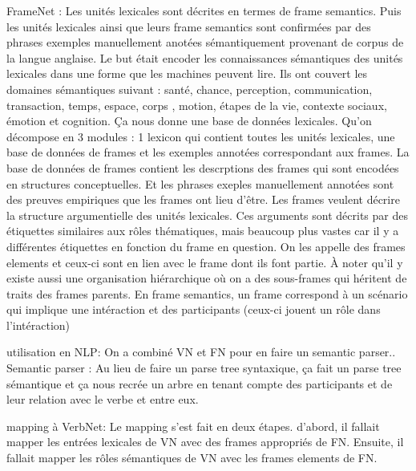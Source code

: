 FrameNet \citep{BakerBerkeleyFrameNetProject1998}: Les unités lexicales sont décrites en termes de frame semantics. Puis les unités lexicales ainsi que leurs frame semantics sont confirmées par des phrases exemples manuellement anotées sémantiquement provenant de corpus de la langue anglaise. Le but était encoder les connaissances sémantiques des unités lexicales dans une forme que les machines peuvent lire. Ils ont couvert les domaines sémantiques suivant : santé, chance, perception, communication, transaction, temps, espace, corps , motion, étapes de la vie, contexte sociaux, émotion et cognition. Ça nous donne une base de données lexicales. Qu'on décompose en 3 modules : 1 lexicon qui contient toutes les unités lexicales, une base de données de frames et les exemples annotées correspondant aux frames. La base de données de frames contient les descrptions des frames qui sont encodées en structures conceptuelles. Et les phrases exeples manuellement annotées sont des preuves empiriques que les frames ont lieu d'être. Les frames veulent décrire la structure argumentielle des unités lexicales. Ces arguments sont décrits par des étiquettes similaires aux rôles thématiques, mais beaucoup plus vastes car il y a différentes étiquettes en fonction du frame en question. On les appelle des frames elements et ceux-ci sont en lien avec le frame dont ils font partie. À noter qu'il y existe aussi une organisation hiérarchique où on a des sous-frames qui héritent de traits des frames parents. En frame semantics, un frame correspond à un scénario qui implique une intéraction et des participants (ceux-ci jouent un rôle dans l'intéraction)\citep{Shi:2005:PPT:2132047.2132058}

utilisation en NLP: On a combiné VN et FN pour en faire un semantic parser.\citep{Shi:2005:PPT:2132047.2132058}. Semantic parser : Au lieu de faire un parse tree syntaxique, ça fait un parse tree sémantique et ça nous recrée un arbre en tenant compte des participants et de leur relation avec le verbe et entre eux. 

mapping à VerbNet:\citep{Shi:2005:PPT:2132047.2132058} Le mapping s'est fait en deux étapes. d'abord, il fallait mapper les entrées lexicales de VN avec des frames appropriés de FN. Ensuite, il fallait mapper les rôles sémantiques de VN avec les frames elements de FN.

